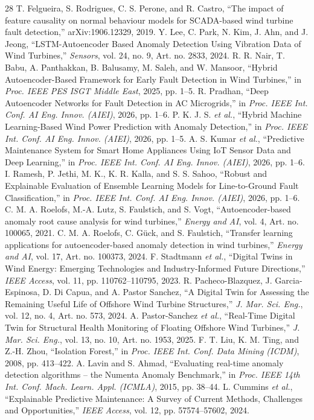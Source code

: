 \documentclass[conference]{IEEEtran}
\begin{document}
\begin{thebibliography}{28}
 T. Felgueira, S. Rodrigues, C. S. Perone, and R. Castro, ``The impact of feature causality on normal behaviour models for SCADA-based wind turbine fault detection,'' arXiv:1906.12329, 2019.
 Y. Lee, C. Park, N. Kim, J. Ahn, and J. Jeong, ``LSTM-Autoencoder Based Anomaly Detection Using Vibration Data of Wind Turbines,'' \textit{Sensors}, vol. 24, no. 9, Art. no. 2833, 2024.
 R. R. Nair, T. Babu, A. Panthakkan, B. Balusamy, M. Saleh, and W. Mansoor, ``Hybrid Autoencoder-Based Framework for Early Fault Detection in Wind Turbines,'' in \textit{Proc. IEEE PES ISGT Middle East}, 2025, pp. 1--5.
 R. Pradhan, ``Deep Autoencoder Networks for Fault Detection in AC Microgrids,'' in \textit{Proc. IEEE Int. Conf. AI Eng. Innov. (AIEI)}, 2026, pp. 1--6.
 P. K. J. S. \textit{et al.}, ``Hybrid Machine Learning-Based Wind Power Prediction with Anomaly Detection,'' in \textit{Proc. IEEE Int. Conf. AI Eng. Innov. (AIEI)}, 2026, pp. 1--5.
 A. S. Kumar \textit{et al.}, ``Predictive Maintenance System for Smart Home Appliances Using IoT Sensor Data and Deep Learning,'' in \textit{Proc. IEEE Int. Conf. AI Eng. Innov. (AIEI)}, 2026, pp. 1--6.
 I. Ramesh, P. Jethi, M. K., K. R. Kalla, and S. S. Sahoo, ``Robust and Explainable Evaluation of Ensemble Learning Models for Line-to-Ground Fault Classification,'' in \textit{Proc. IEEE Int. Conf. AI Eng. Innov. (AIEI)}, 2026, pp. 1--6.
 C. M. A. Roelofs, M.-A. Lutz, S. Faulstich, and S. Vogt, ``Autoencoder-based anomaly root cause analysis for wind turbines,'' \textit{Energy and AI}, vol. 4, Art. no. 100065, 2021.
 C. M. A. Roelofs, C. G\"uck, and S. Faulstich, ``Transfer learning applications for autoencoder-based anomaly detection in wind turbines,'' \textit{Energy and AI}, vol. 17, Art. no. 100373, 2024.
 F. Stadtmann \textit{et al.}, ``Digital Twins in Wind Energy: Emerging Technologies and Industry-Informed Future Directions,'' \textit{IEEE Access}, vol. 11, pp. 110762--110795, 2023.
 R. Pacheco-Blazquez, J. Garcia-Espinosa, D. Di Capua, and A. Pastor Sanchez, ``A Digital Twin for Assessing the Remaining Useful Life of Offshore Wind Turbine Structures,'' \textit{J. Mar. Sci. Eng.}, vol. 12, no. 4, Art. no. 573, 2024.
 A. Pastor-Sanchez \textit{et al.}, ``Real-Time Digital Twin for Structural Health Monitoring of Floating Offshore Wind Turbines,'' \textit{J. Mar. Sci. Eng.}, vol. 13, no. 10, Art. no. 1953, 2025.
 F. T. Liu, K. M. Ting, and Z.-H. Zhou, ``Isolation Forest,'' in \textit{Proc. IEEE Int. Conf. Data Mining (ICDM)}, 2008, pp. 413--422.
 A. Lavin and S. Ahmad, ``Evaluating real-time anomaly detection algorithms -- the Numenta Anomaly Benchmark,'' in \textit{Proc. IEEE 14th Int. Conf. Mach. Learn. Appl. (ICMLA)}, 2015, pp. 38--44.
 L. Cummins \textit{et al.}, ``Explainable Predictive Maintenance: A Survey of Current Methods, Challenges and Opportunities,'' \textit{IEEE Access}, vol. 12, pp. 57574--57602, 2024.
\end{thebibliography}
\end{document}
